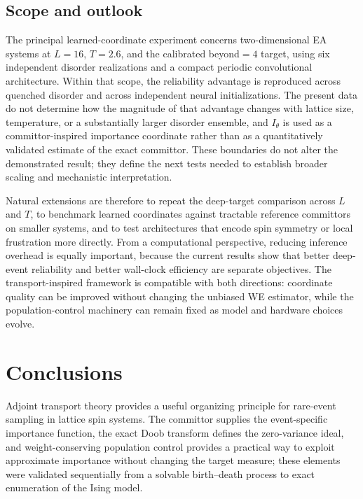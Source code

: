 \documentclass[a4paper,fleqn]{cas-sc}
\begin{document}
\subsection{Scope and outlook}\label{sec:scope}
The principal learned-coordinate experiment concerns two-dimensional EA systems at $L=16$,
$T=2.6$, and the calibrated beyond$=4$ target, using six independent disorder realizations and
a compact periodic convolutional architecture. Within that scope, the reliability advantage is
reproduced across quenched disorder and across independent neural initializations. The present
data do not determine how the magnitude of that advantage changes with lattice size,
temperature, or a substantially larger disorder ensemble, and $I_\theta$ is used as a
committor-inspired importance coordinate rather than as a quantitatively validated estimate of
the exact committor. These boundaries do not alter the demonstrated result; they define the
next tests needed to establish broader scaling and mechanistic interpretation.

Natural extensions are therefore to repeat the deep-target comparison across $L$ and $T$, to
benchmark learned coordinates against tractable reference committors on smaller systems, and to
test architectures that encode spin symmetry or local frustration more directly. From a
computational perspective, reducing inference overhead is equally important, because the
current results show that better deep-event reliability and better wall-clock efficiency are
separate objectives. The transport-inspired framework is compatible with both directions:
coordinate quality can be improved without changing the unbiased WE estimator, while the
population-control machinery can remain fixed as model and hardware choices evolve.

\FloatBarrier

\section{Conclusions}\label{sec:conclusions}

Adjoint transport theory provides a useful organizing principle for rare-event sampling in
lattice spin systems. The committor supplies the event-specific importance function, the exact
Doob transform defines the zero-variance ideal, and weight-conserving population control
provides a practical way to exploit approximate importance without changing the target
measure; these elements were validated sequentially from a solvable birth--death process to
exact enumeration of the Ising model.
\end{document}
